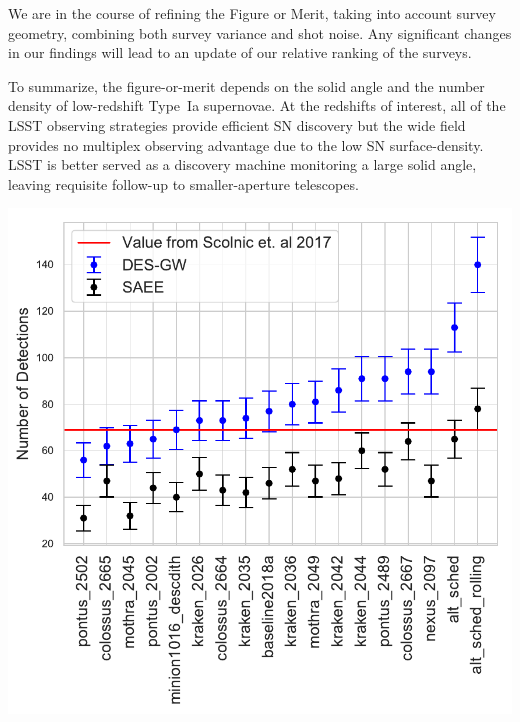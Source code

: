 \documentclass[a4paper,10pt]{article}
\begin{document}
We are in the course of refining the Figure or Merit, taking into account survey geometry, combining both survey variance and shot noise.
Any significant changes in our findings will lead to an update of our relative
ranking of the surveys.

To summarize, the figure-or-merit depends on the solid angle and the number density of low-redshift Type~Ia supernovae.  At the redshifts of interest,
all of the LSST observing strategies provide efficient SN discovery but the wide field
provides no multiplex observing advantage due to the low SN surface-density.  LSST is better served as a discovery machine monitoring 
a large solid angle, leaving requisite follow-up to smaller-aperture telescopes.

\begin{minipage}{\columnwidth}
\centering
 \includegraphics[width=0.5\columnwidth]{wfd_detection_counts_by_cadence}
\end{minipage}



%
%
\end{document}
